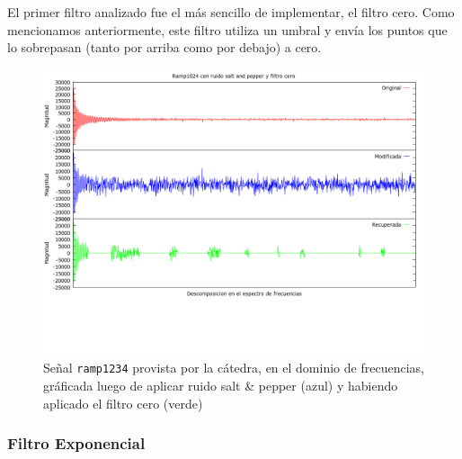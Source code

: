 El primer filtro analizado fue el m\'as sencillo de implementar, el filtro cero.
Como mencionamos anteriormente, este filtro utiliza un umbral y env\'ia los
puntos que lo sobrepasan (tanto por arriba como por debajo) a cero.

\begin{figure}[H]
\begin {center}
\includegraphics[width=500pt]{imagenes/ramp1234-imp-zero.png}
\end {center}
\caption{Se\~nal \texttt{ramp1234} provista por la c\'atedra, en el dominio de frecuencias, gr\'aficada
luego de aplicar ruido salt \& pepper (azul) y habiendo aplicado el filtro cero (verde)}
\label{fig:Dopp1024zero}
\end{figure}


\subsubsection{Filtro Exponencial}



